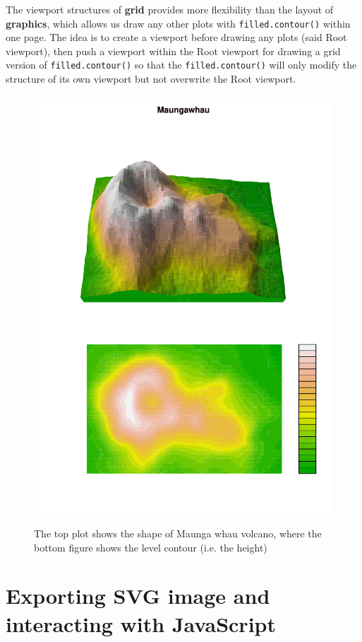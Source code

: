 \documentclass{report}
\begin{document}
The viewport structures of \textbf{grid} provides more flexibility than the layout of \textbf{graphics}, which allows us draw any other plots with \texttt{filled.contour()} within one page. The idea is to create a viewport before drawing any plots (said Root viewport), then push a viewport within the Root viewport for drawing a grid version of \texttt{filled.contour()} so that the \texttt{filled.contour()} will only modify the structure of its own viewport but not overwrite the Root viewport.\\
\begin{figure}[H]
	\begin{center}
		\includegraphics[height = 16cm, width = 12cm]{figure/Chapter6_example_3_1.pdf}
		\caption{The top plot shows the shape of Maunga whau volcano, where the bottom figure shows the level contour (i.e. the height)}
		\label{Example_6.2.1}
	\end{center}
\end{figure}


\newpage
\section{Exporting SVG image and interacting with JavaScript}
\end{document}

